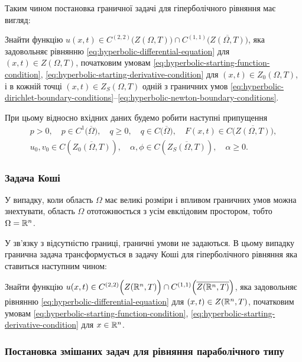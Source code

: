 Таким чином постановка граничної задачі для гіперболічного рівняння має вигляд: \medskip

Знайти функцію $u(x, t) \in C^{(2, 2)} \Big( Z(\Omega, T) \Big) \cap C^{(1, 1)} \Big( \overline {Z(\Omega, T)} \Big)$, яка задовольняє рівнянню \eqref{eq:hyperbolic-differential-equation} для $(x, t) \in Z(\Omega, T)$, початковим умовам \eqref{eq:hyperbolic-starting-function-condition}, \eqref{eq:hyperbolic-starting-derivative-condition} для $(x, t) \in Z_0(\Omega, T)$, і в кожній точці $(x, t) \in Z_S(\Omega, T)$ одній з граничних умов \eqref{eq:hyperbolic-dirichlet-boundary-conditions}--\eqref{eq:hyperbolic-newton-boundary-conditions}. \medskip

При цьому відносно вхідних даних будемо робити наступні припущення
\begin{gather}
    p > 0, \quad p \in C^1 \Big( \overline \Omega \Big), \quad q \ge 0, \quad q \in C \Big( \overline \Omega \Big), \quad F(x, t) \in C \Big( \overline{Z(\Omega, T)} \Big), \\
    u_0, v_0 \in C \left( \overline{Z_0(\Omega, T)} \right), \quad \alpha, \phi \in C \left( \overline{Z_S(\Omega, T)} \right), \quad \alpha \ge 0.
\end{gather}

\subsubsection{Задача Коші}

У випадку, коли область $\Omega$ має великі розміри і впливом граничних умов можна знехтувати, область $\Omega$ ототожнюється з усім евклідовим простором, тобто $\Omega = \mathbb{R}^n$. \medskip

У зв'язку з відсутністю границі, граничні умови не задаються. В цьому випадку гранична задача трансформується в задачу Коші для гіперболічного рівняння яка ставиться наступним чином: \medskip

Знайти функцію $u(x, t) \in C^{(2, 2)} \Big( Z(\mathbb{R}^n, T) \Big) \cap C^{(1, 1)} \Big( \overline {Z(\mathbb{R}^n, T)} \Big)$, яка задовольняє рівнянню \eqref{eq:hyperbolic-differential-equation} для $(x, t) \in Z(\mathbb{R}^n, T)$, початковим умовам \eqref{eq:hyperbolic-starting-function-condition}, \eqref{eq:hyperbolic-starting-derivative-condition} для $x \in \mathbb{R}^n$.

\subsubsection{Постановка змішаних задач для рівняння параболічного типу}

